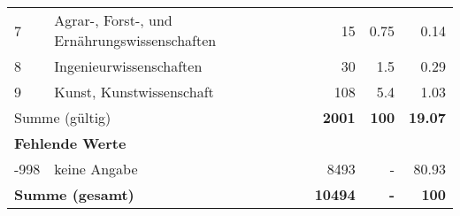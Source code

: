 \begin{longtable}{lXrrr}
     7 &
     \multicolumn{1}{X}{ Agrar-, Forst-, und Ernährungswissenschaften   } &


       \num{15} &
       \num[round-mode=places,round-precision=2]{0.75} &
         \num[round-mode=places,round-precision=2]{0.14} \\

     8 &
     \multicolumn{1}{X}{ Ingenieurwissenschaften   } &


       \num{30} &
       \num[round-mode=places,round-precision=2]{1.5} &
         \num[round-mode=places,round-precision=2]{0.29} \\

     9 &
     \multicolumn{1}{X}{ Kunst, Kunstwissenschaft   } &


       \num{108} &
       \num[round-mode=places,round-precision=2]{5.4} &
         \num[round-mode=places,round-precision=2]{1.03} \\
     \midrule
     \multicolumn{2}{l}{Summe (gültig)} &
       \textbf{\num{2001}} &
     \textbf{\num{100}} &
       \textbf{\num[round-mode=places,round-precision=2]{19.07}} \\
     \multicolumn{5}{l}{\textbf{Fehlende Werte}}\\
       -998 &
       keine Angabe &
         \num{8493} &
        - &
         \num[round-mode=places,round-precision=2]{80.93} \\
     \midrule
     \multicolumn{2}{l}{\textbf{Summe (gesamt)}} &
          \textbf{\num{10494}} &
        \textbf{-} &
        \textbf{\num{100}} \\
     \bottomrule
     \end{longtable}
     
